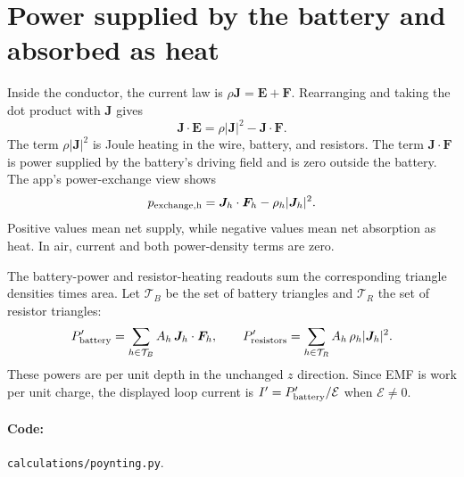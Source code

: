 \documentclass[11pt]{article}
\begin{document}
\section{Power supplied by the battery and absorbed as heat}
Inside the conductor, the current law is
$\rho\bm J=\bm E+\bm F$. Rearranging and taking the dot
product with $\bm J$ gives
\begin{equation}
 \bm J\cdot\bm E
 =\rho|\bm J|^2-\bm J\cdot\bm F.
 \label{eq:work}
\end{equation}
The term $\rho|\bm J|^2$ is Joule heating in the wire,
battery, and resistors. The term $\bm J\cdot\bm F$
is power supplied by the battery's driving field and
is zero outside the battery. The app's power-exchange
view shows
\begin{equation}
 p_{\rm exchange,h}
 =\bm J_h\cdot\bm F_h-\rho_h|\bm J_h|^2.
\end{equation}
Positive values mean net supply, while negative values
mean net absorption as heat. In air, current and both
power-density terms are zero.

The battery-power and resistor-heating readouts sum the
corresponding triangle densities times area. Let $\mathcal T_B$ be
the set of battery triangles and $\mathcal T_R$ the set of resistor
triangles:
\begin{equation}
 P'_{\rm battery}
 =\sum_{h\in\mathcal T_B}A_h\,\bm J_h\cdot\bm F_h,
 \qquad
 P'_{\rm resistors}
 =\sum_{h\in\mathcal T_R}A_h\,\rho_h|\bm J_h|^2.
\end{equation}
These powers are per unit depth in the unchanged $z$
direction. Since EMF is work per unit charge, the displayed
loop current is $I'=P'_{\rm battery}/\mathcal E$ when
$\mathcal E\ne0$.

\paragraph{Code:} \texttt{calculations/poynting.py}.
\end{document}
